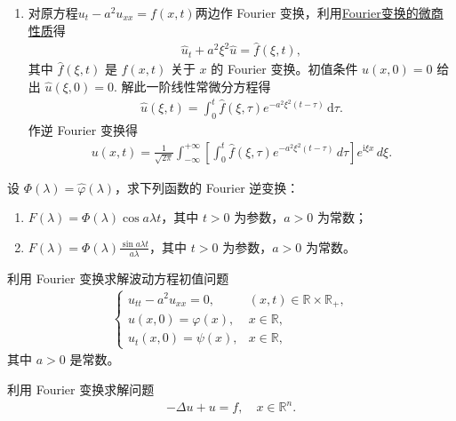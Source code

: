 \documentclass[../../main.tex]{subfiles}%
\begin{document}
\begin{solution}
\begin{enumerate}[(1)]
\item 对原方程$u_t-a^2u_{xx}=f(x,t)$两边作 Fourier 变换，利用\hyperref[proposition:Fourier 变换的基本性质1-2]{Fourier变换的微商性质}得
\begin{align*}
\hat u_t+a^2\xi^2\hat u=\hat f(\xi,t),
\end{align*}
其中 $\hat f(\xi,t)$ 是 $f(x,t)$ 关于 $x$ 的 Fourier 变换。初值条件 $u(x,0)=0$ 给出 $\hat u(\xi,0)=0$. 解此一阶线性常微分方程得
\begin{align*}
\hat u(\xi,t)=\int_0^t \hat f(\xi,\tau)e^{-a^2\xi^2(t-\tau)}\,\mathrm{d}\tau.
\end{align*}
作逆 Fourier 变换得
\begin{align*}
u(x,t)=\frac{1}{\sqrt{2\pi}}\int_{-\infty}^{+\infty}\left[\int_0^t \hat f(\xi,\tau)e^{-a^2\xi^2(t-\tau)}\,d\tau\right]e^{\mathrm{i}\xi x}\,d\xi.
\end{align*}
\end{enumerate}
\end{solution}

\begin{example}
设 $\Phi(\lambda)=\hat{\varphi}(\lambda)$，求下列函数的 Fourier 逆变换：
\begin{enumerate}[(1)]
\item $F(\lambda)=\Phi(\lambda)\cos a\lambda t$，其中 $t>0$ 为参数，$a>0$ 为常数；
\item $F(\lambda)=\Phi(\lambda)\frac{\sin a\lambda t}{a\lambda}$，其中 $t>0$ 为参数，$a>0$ 为常数。
\end{enumerate}
\end{example}

\begin{example}
利用 Fourier 变换求解波动方程初值问题
\begin{align*}
\begin{cases}
u_{tt}-a^2u_{xx}=0, & (x,t)\in\mathbb{R}\times\mathbb{R}_+,\\
u(x,0)=\varphi(x), & x\in\mathbb{R},\\
u_t(x,0)=\psi(x), & x\in\mathbb{R},
\end{cases}
\end{align*}
其中 $a>0$ 是常数。
\end{example}

\begin{example}
利用 Fourier 变换求解问题
\begin{align*}
-\Delta u+u=f,\quad x\in\mathbb{R}^n.
\end{align*}
\end{example}
\end{document}
